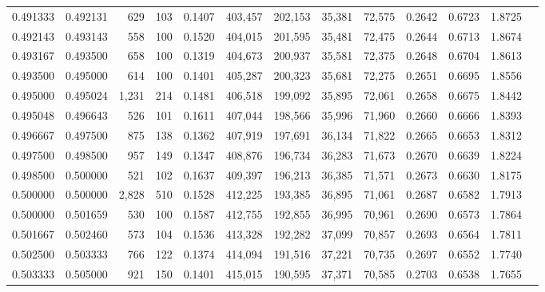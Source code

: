 \begin{tabular}{rrrrrrrrrrrrr}
0.491333 & 0.492131 &   629 & 103 &                                     0.1407 & 403,457 & 202,153 &  35,381 &  72,575 & 0.2642 & 0.6723 & 1.8725 \\
0.492143 & 0.493143 &   558 & 100 &                                     0.1520 & 404,015 & 201,595 &  35,481 &  72,475 & 0.2644 & 0.6713 & 1.8674 \\
0.493167 & 0.493500 &   658 & 100 &                                     0.1319 & 404,673 & 200,937 &  35,581 &  72,375 & 0.2648 & 0.6704 & 1.8613 \\
0.493500 & 0.495000 &   614 & 100 &                                     0.1401 & 405,287 & 200,323 &  35,681 &  72,275 & 0.2651 & 0.6695 & 1.8556 \\
0.495000 & 0.495024 & 1,231 & 214 &                                     0.1481 & 406,518 & 199,092 &  35,895 &  72,061 & 0.2658 & 0.6675 & 1.8442 \\
0.495048 & 0.496643 &   526 & 101 &                                     0.1611 & 407,044 & 198,566 &  35,996 &  71,960 & 0.2660 & 0.6666 & 1.8393 \\
0.496667 & 0.497500 &   875 & 138 &                                     0.1362 & 407,919 & 197,691 &  36,134 &  71,822 & 0.2665 & 0.6653 & 1.8312 \\
0.497500 & 0.498500 &   957 & 149 &                                     0.1347 & 408,876 & 196,734 &  36,283 &  71,673 & 0.2670 & 0.6639 & 1.8224 \\
0.498500 & 0.500000 &   521 & 102 &                                     0.1637 & 409,397 & 196,213 &  36,385 &  71,571 & 0.2673 & 0.6630 & 1.8175 \\
0.500000 & 0.500000 & 2,828 & 510 &                                     0.1528 & 412,225 & 193,385 &  36,895 &  71,061 & 0.2687 & 0.6582 & 1.7913 \\
0.500000 & 0.501659 &   530 & 100 &                                     0.1587 & 412,755 & 192,855 &  36,995 &  70,961 & 0.2690 & 0.6573 & 1.7864 \\
0.501667 & 0.502460 &   573 & 104 &                                     0.1536 & 413,328 & 192,282 &  37,099 &  70,857 & 0.2693 & 0.6564 & 1.7811 \\
0.502500 & 0.503333 &   766 & 122 &                                     0.1374 & 414,094 & 191,516 &  37,221 &  70,735 & 0.2697 & 0.6552 & 1.7740 \\
0.503333 & 0.505000 &   921 & 150 &                                     0.1401 & 415,015 & 190,595 &  37,371 &  70,585 & 0.2703 & 0.6538 & 1.7655 \\

\end{tabular}
